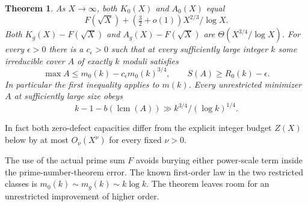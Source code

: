 \documentclass[11pt]{article}
\newtheorem{theorem}{Theorem}
\newcommand{\lcm}{\operatorname{lcm}}
\begin{document}
\begin{theorem}\label{main}
As $X\to\infty$, both $K_0(X)$ and $A_0(X)$ equal
\[
 F(\sqrt X)+\left(\tfrac32+o(1)\right)X^{2/3}/\log X .
\]
Both $K_g(X)-F(\sqrt X)$ and $A_g(X)-F(\sqrt X)$ are $\Theta(X^{3/4}/\log X)$.
For every $\epsilon>0$ there is a $c_\epsilon>0$ such that at every sufficiently large integer $k$ some irreducible cover $A$ of exactly $k$ moduli satisfies
\[
 \max A\le m_0(k)-c_\epsilon m_0(k)^{3/4},
 \qquad S(A)\ge R_0(k)-\epsilon .
\]
In particular the first inequality applies to $m(k)$. Every unrestricted minimizer $A$ at sufficiently large size obeys
\[
 k-1-b(\lcm(A))\gg k^{3/4}/(\log k)^{1/4}.
\]
\end{theorem}
In fact both zero-defect capacities differ from the explicit integer budget $Z(X)$ below by at most $O_\nu(X^\nu)$ for every fixed $\nu>0$.

The use of the actual prime sum $F$ avoids burying either power-scale term inside the prime-number-theorem error. The known first-order law in the two restricted classes is $m_0(k)\sim m_g(k)\sim k\log k$. The theorem leaves room for an unrestricted improvement of higher order.
\end{document}
